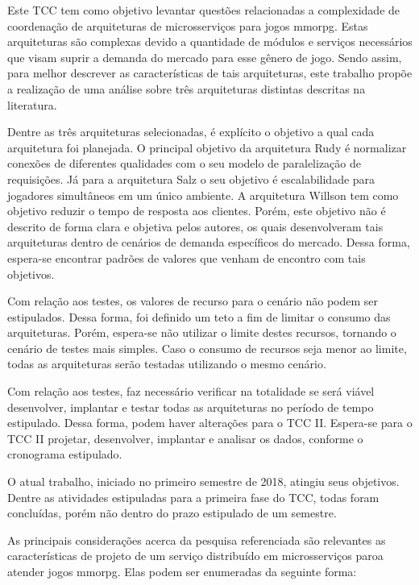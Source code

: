 Este TCC tem como objetivo levantar questões relacionadas a complexidade de coordenação de arquiteturas de microsserviços para jogos \ac{mmorpg}.
%
Estas arquiteturas são complexas devido a quantidade de módulos e serviços necessários que visam suprir a demanda do mercado para esse gênero de jogo.
%
Sendo assim, para melhor descrever as características de tais arquiteturas, este trabalho propõe a realização de uma análise sobre três arquiteturas distintas descritas na literatura.


Dentre as três arquiteturas selecionadas, é explícito o objetivo a qual cada arquitetura foi planejada.
%
O principal objetivo da arquitetura Rudy é normalizar conexões de diferentes qualidades com o seu modelo de paralelização de requisições.
%
Já para a arquitetura Salz o seu objetivo é escalabilidade para jogadores simultâneos em um único ambiente.
%
A arquitetura Willson tem como objetivo reduzir o tempo de resposta aos clientes.
%
Porém, este objetivo não é descrito de forma clara e objetiva pelos autores, os quais desenvolveram tais arquiteturas dentro de cenários de demanda específicos do mercado.
%
Dessa forma, espera-se encontrar padrões de valores que venham de encontro com tais objetivos.

Com relação aos testes, os valores de recurso para o cenário não podem ser estipulados.
%
Dessa forma, foi definido um teto a fim de limitar o consumo das arquiteturas.
%
Porém, espera-se não utilizar o limite destes recursos, tornando o cenário de testes mais simples.
%
Caso o consumo de recursos seja menor ao limite, todas as arquiteturas serão testadas utilizando o mesmo cenário.

Com relação aos testes, faz necessário verificar na totalidade se será viável desenvolver, implantar e testar todas as arquiteturas no período de tempo estipulado.
%
Dessa forma, podem haver alterações para o TCC II.
%
Espera-se para o TCC II projetar, desenvolver, implantar e analisar os dados, conforme o cronograma estipulado.

O atual trabalho, iniciado no primeiro semestre de 2018, atingiu seus objetivos.
%
Dentre as atividades estipuladas para a primeira fase do TCC, todas foram concluídas, porém não dentro do prazo estipulado de um semestre.

As principais considerações acerca da pesquisa referenciada são relevantes as características de projeto de um serviço distribuído em microsserviços paroa atender jogos \ac{mmorpg}.
%
Elas podem ser enumeradas da seguinte forma:


